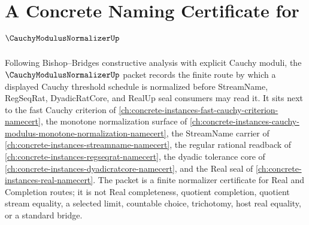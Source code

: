 \chapter{A Concrete Naming Certificate for $\CauchyModulusNormalizerUp$}
\label{ch:concrete-instances-cauchy-modulus-normalizer-namecert}

Following Bishop--Bridges constructive analysis with explicit Cauchy moduli, the $\CauchyModulusNormalizerUp$ packet records the finite route by which a displayed Cauchy threshold schedule is normalized before StreamName, RegSeqRat, DyadicRatCore, and RealUp seal consumers may read it. It sits next to the fast Cauchy criterion of \autoref{ch:concrete-instances-fast-cauchy-criterion-namecert}, the monotone normalization surface of \autoref{ch:concrete-instances-cauchy-modulus-monotone-normalization-namecert}, the StreamName carrier of \autoref{ch:concrete-instances-streamname-namecert}, the regular rational readback of \autoref{ch:concrete-instances-regseqrat-namecert}, the dyadic tolerance core of \autoref{ch:concrete-instances-dyadicratcore-namecert}, and the Real seal of \autoref{ch:concrete-instances-real-namecert}. The packet is a finite normalizer certificate for Real and Completion routes; it is not Real completeness, quotient completion, quotient stream equality, a selected limit, countable choice, trichotomy, host real equality, or a standard bridge.

